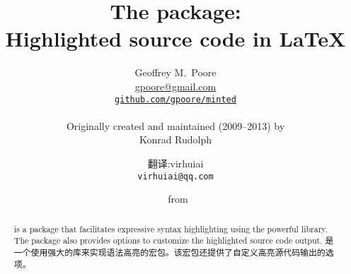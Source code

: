 
\title{The \textcolor{minted@mint}{} package:\\Highlighted source code in \LaTeX}
\author{Geoffrey M.\ Poore \\ \url{gpoore@gmail.com} \\ \href{https://github.com/gpoore/minted}{\texttt{github.com/gpoore/minted}} \\ ~\\ Originally created and maintained (2009--2013) by \\ Konrad Rudolph\and 翻译:virhuiai \\{\tt virhuiai@qq.com}}
\date{\fileversion~from \filedate}

\maketitle 

\begin{abstract}
\begin{paracol}{2}
\noindent{} is a package that facilitates expressive syntax highlighting
using the powerful  library. The package also provides options to
customize the highlighted source code output.
\switchcolumn\noindent
{}是一个使用强大的库来实现语法高亮的宏包。该宏包还提供了自定义高亮源代码输出的选项。
\end{paracol}


\end{abstract}

\vspace{2in}